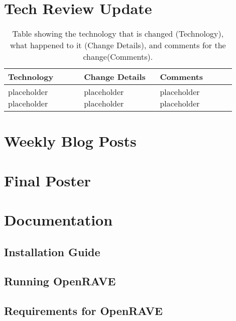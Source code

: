 \documentclass[10pt,journal,compsoc,draftclsnofoot]{IEEEtran}
\begin{document}
\begin{flushleft}
\section{Tech Review Update}

\begin{center}
\begin{table}[H]
\caption{Table showing the technology that is changed (Technology), what happened to it (Change Details), and comments for the change(Comments).}
\begin{tabular}{ | p{0.3\linewidth} | p{0.3\linewidth} | p{0.3\linewidth} | }
\hline
\textbf{Technology}  & \textbf{Change Details}  & \textbf{Comments} \\ \hline

placeholder placeholder & 
placeholder placeholder & 
placeholder placeholder \\ \hline

\end{tabular}
\newline
\label{table:TechReviewUpdate}
\end{table}
\end{center}

\newpage

\section{Weekly Blog Posts}


\section{Final Poster}



\section{Documentation}

\subsection{Installation Guide}

\subsection{Running OpenRAVE}

\subsection{Requirements for OpenRAVE}


\end{flushleft}
\end{document}
